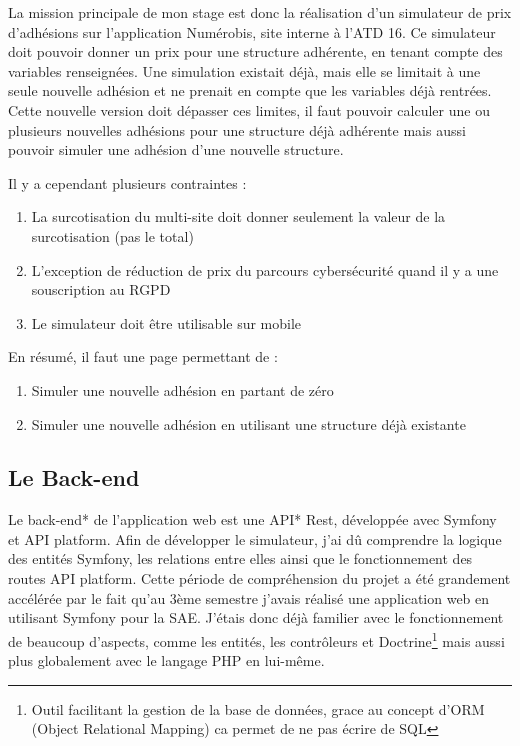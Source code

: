 \documentclass[a4paper,12pt]{report}
\begin{document}
La mission principale de mon stage est donc la réalisation d'un simulateur de prix d'adhésions sur l'application Numérobis, site interne à l'ATD 16. Ce simulateur doit pouvoir donner un prix pour une structure adhérente, en tenant compte des variables renseignées. Une simulation existait déjà, mais elle se limitait à une seule nouvelle adhésion et ne prenait en compte que les variables déjà rentrées. Cette nouvelle version doit dépasser ces limites, il faut pouvoir calculer une ou plusieurs nouvelles adhésions pour une structure déjà adhérente mais aussi pouvoir simuler une adhésion d'une nouvelle structure. 

Il y a cependant plusieurs contraintes :
\begin{enumerate}
    \item La surcotisation du multi-site doit donner seulement la valeur de la surcotisation (pas le total)
    \item L'exception de réduction de prix du parcours cybersécurité quand il y a une souscription au RGPD
    \item Le simulateur doit être utilisable sur mobile
\end{enumerate}

En résumé, il faut une page permettant de :
\begin{enumerate}
    \item Simuler une nouvelle adhésion en partant de zéro
    \item Simuler une nouvelle adhésion en utilisant une structure déjà existante
\end{enumerate}

\subsection{Le Back-end}
Le back-end* de l'application web est une API* Rest, développée avec Symfony et API platform. Afin de développer le simulateur, j'ai dû comprendre la logique des entités Symfony, les relations entre elles ainsi que le fonctionnement des routes API platform. Cette période de compréhension du projet a été grandement accélérée par le fait qu'au 3ème semestre j'avais réalisé une application web en utilisant Symfony pour la SAE. J'étais donc déjà familier avec le fonctionnement de beaucoup d'aspects, comme les entités, les contrôleurs et Doctrine\footnote{Outil facilitant la gestion de la base de données, grace au concept d'ORM (Object Relational Mapping) ca permet de ne pas écrire de SQL} mais aussi plus globalement avec le langage PHP en lui-même.
\end{document}

